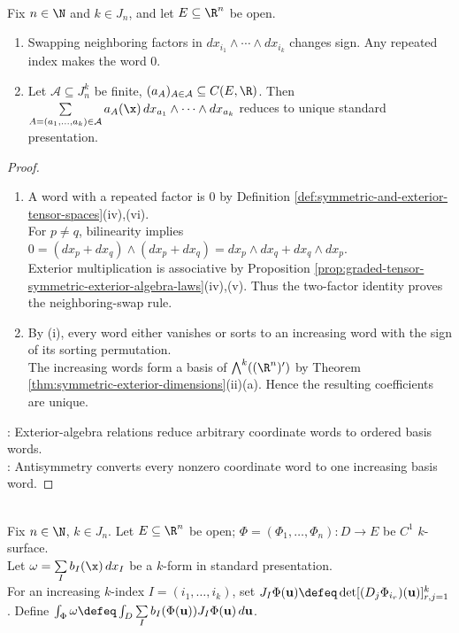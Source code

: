 \begin{proposition} \label{prop:basic-forms-standard-presentation} \\
Fix $n\in\N$ and $k\in J_n$, and let $E\subseteq\R^n$ be open.
\begin{enumerate}[label=(\roman*)]
\setlength{\itemsep}{0pt}
\item Swapping neighboring factors in $dx_{i_1}\wedge\cdots\wedge dx_{i_k}$ changes sign. Any repeated index makes the word $0$.
\item Let $\mathcal A\subseteq J_n^k$ be finite, $(a_A)_{A\in\mathcal A}\subseteq C(E,\R)$. Then $\sum\limits_{A=(a_1,\ldots,a_k)\in\mathcal A}a_A(\x)\,dx_{a_1}\wedge\cdots\wedge dx_{a_k}$ reduces to unique standard presentation.
\end{enumerate}
\begin{proof}
\begin{enumerate}[label=(\roman*)]
\setlength{\itemsep}{0pt}
\item A word with a repeated factor is $0$ by Definition \ref{def:symmetric-and-exterior-tensor-spaces}(iv),(vi).\\
For $p\neq q$, bilinearity implies $0=(dx_p+dx_q)\wedge(dx_p+dx_q)=dx_p\wedge dx_q+dx_q\wedge dx_p$.\\
Exterior multiplication is associative by Proposition \ref{prop:graded-tensor-symmetric-exterior-algebra-laws}(iv),(v). Thus the two-factor identity proves the neighboring-swap rule.
\item By (i), every word either vanishes or sorts to an increasing word with the sign of its sorting permutation.\\
The increasing words form a basis of $\bigwedge^k((\R^n)')$ by Theorem \ref{thm:symmetric-exterior-dimensions}(ii)(a). Hence the resulting coefficients are unique.
\end{enumerate}
: Exterior-algebra relations reduce arbitrary coordinate words to ordered basis words.\\
: Antisymmetry converts every nonzero coordinate word to one increasing basis word.
\end{proof}
\end{proposition}

\begin{definition} \label{def:integration-of-differential-form} \\
Fix $n\in\N$, $k\in J_n$. Let $E\subseteq\R^n$ be open; $\Phi=(\Phi_1,\ldots,\Phi_n):D\to E$ be $C^1$ $k$-surface.\\
Let $\omega=\sum\limits_I b_I(\x)\,dx_I$ be a $k$-form in standard presentation.\\
For an increasing $k$-index $I=(i_1,\ldots,i_k)$, set $J_I\Phi(\mathbf{u})\defeq\det[(D_j\Phi_{i_r})(\mathbf{u})]_{r,j=1}^{k}$. Define $\int_{\Phi}\omega\defeq\int_D\sum\limits_I b_I(\Phi(\mathbf{u}))J_I\Phi(\mathbf{u})\,d\mathbf{u}$.
\end{definition}

